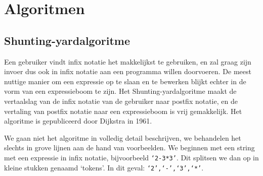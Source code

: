 \documentclass[a4paper]{article}
\begin{document}
\section{Algoritmen}
\subsection{Shunting-yardalgoritme}
Een gebruiker vindt infix notatie het makkelijkst te gebruiken, en zal graag zijn invoer dus ook in infix notatie aan een programma willen doorvoeren. De meest nuttige manier om een expressie op te slaan en te bewerken blijkt echter in de vorm van een expressieboom te zijn. Het Shunting-yardalgoritme maakt de vertaalslag van de infix notatie van de gebruiker naar postfix notatie, en de vertaling van postfix notatie naar een expressieboom is vrij gemakkelijk. Het algoritme is gepubliceerd door Dijkstra in 1961. 

We gaan niet het algoritme in volledig detail beschrijven, we behandelen het slechts in grove lijnen aan de hand van voorbeelden. We beginnen met een string met een expressie in infix notatie, bijvoorbeeld \texttt{`2-3*3'}. Dit splitsen we dan op in kleine stukken genaamd `tokens'. In dit geval: \texttt{`2',`-',`3',`*'}. 
\end{document}
